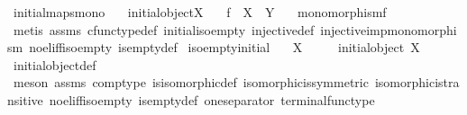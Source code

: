 \begin{isabellebody}
\isamarkupfalse%
%
\endisatagproof
{\isafoldproof}%
%
\isadelimproof
\isanewline
%
\endisadelimproof
\isanewline
{}\isamarkupfalse%
\ initial{\isacharunderscore}{\kern0pt}maps{\isacharunderscore}{\kern0pt}mono{\isacharcolon}{\kern0pt}\isanewline
\ \ \ {\isachardoublequoteopen}initial{\isacharunderscore}{\kern0pt}object{\isacharparenleft}{\kern0pt}X{\isacharparenright}{\kern0pt}{\isachardoublequoteclose}\isanewline
\ \ \ {\isachardoublequoteopen}f\ {\isacharcolon}{\kern0pt}\ X\ {\isasymrightarrow}\ Y{\isachardoublequoteclose}\isanewline
\ \ \ {\isachardoublequoteopen}monomorphism{\isacharparenleft}{\kern0pt}f{\isacharparenright}{\kern0pt}{\isachardoublequoteclose}\isanewline
%
\isadelimproof
\ \ %
\endisadelimproof
%
\isatagproof
{}\isamarkupfalse%
\ {\isacharparenleft}{\kern0pt}metis\ assms\ cfunc{\isacharunderscore}{\kern0pt}type{\isacharunderscore}{\kern0pt}def\ initial{\isacharunderscore}{\kern0pt}iso{\isacharunderscore}{\kern0pt}empty\ injective{\isacharunderscore}{\kern0pt}def\ injective{\isacharunderscore}{\kern0pt}imp{\isacharunderscore}{\kern0pt}monomorphism\ no{\isacharunderscore}{\kern0pt}el{\isacharunderscore}{\kern0pt}iff{\isacharunderscore}{\kern0pt}iso{\isacharunderscore}{\kern0pt}empty\ is{\isacharunderscore}{\kern0pt}empty{\isacharunderscore}{\kern0pt}def{\isacharparenright}{\kern0pt}%
\endisatagproof
{\isafoldproof}%
%
\isadelimproof
\isanewline
%
\endisadelimproof
\isanewline
{}\isamarkupfalse%
\ iso{\isacharunderscore}{\kern0pt}empty{\isacharunderscore}{\kern0pt}initial{\isacharcolon}{\kern0pt}\isanewline
\ \ \ {\isachardoublequoteopen}X\ {\isasymcong}\ {\isasymemptyset}{\isachardoublequoteclose}\isanewline
\ \ \ {\isachardoublequoteopen}initial{\isacharunderscore}{\kern0pt}object\ X{\isachardoublequoteclose}\isanewline
%
\isadelimproof
\ \ %
\endisadelimproof
%
\isatagproof
{}\isamarkupfalse%
\ initial{\isacharunderscore}{\kern0pt}object{\isacharunderscore}{\kern0pt}def\isanewline
\ \ \isamarkupfalse%
\ {\isacharparenleft}{\kern0pt}meson\ assms\ comp{\isacharunderscore}{\kern0pt}type\ is{\isacharunderscore}{\kern0pt}isomorphic{\isacharunderscore}{\kern0pt}def\ isomorphic{\isacharunderscore}{\kern0pt}is{\isacharunderscore}{\kern0pt}symmetric\ isomorphic{\isacharunderscore}{\kern0pt}is{\isacharunderscore}{\kern0pt}transitive\ no{\isacharunderscore}{\kern0pt}el{\isacharunderscore}{\kern0pt}iff{\isacharunderscore}{\kern0pt}iso{\isacharunderscore}{\kern0pt}empty\ is{\isacharunderscore}{\kern0pt}empty{\isacharunderscore}{\kern0pt}def\ one{\isacharunderscore}{\kern0pt}separator\ terminal{\isacharunderscore}{\kern0pt}func{\isacharunderscore}{\kern0pt}type{\isacharparenright}{\kern0pt}%

\end{isabellebody}
